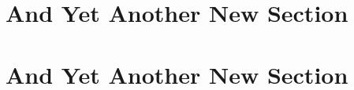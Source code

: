 \section{And Yet Another New Section}
\lipsum[3-4]

\section{And Yet Another New Section}
\lipsum[3-4]



\cleardoublepage
{}
\begin{thebibliography}{999}

\end{thebibliography}

\cleardoublepage
{}
